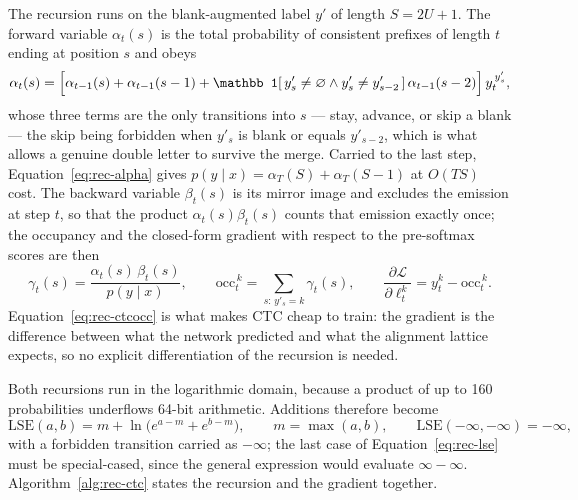 The recursion runs on the blank-augmented label $y'$ of length $S=2U+1$. The forward variable $\alpha_t(s)$ is the total probability of consistent prefixes of length $t$ ending at position $s$ and obeys
\begin{equation}
\alpha_t(s)=\Bigl[\alpha_{t-1}(s)+\alpha_{t-1}(s-1)+\mathbb 1[\,y'_s\ne\varnothing\wedge y'_s\ne y'_{s-2}\,]\,\alpha_{t-1}(s-2)\Bigr]\,y_t^{\,y'_s},\label{eq:rec-alpha}
\end{equation}
whose three terms are the only transitions into $s$ --- stay, advance, or skip a blank --- the skip being forbidden when $y'_s$ is blank or equals $y'_{s-2}$, which is what allows a genuine double letter to survive the merge. Carried to the last step, Equation~\ref{eq:rec-alpha} gives $p(y\mid x)=\alpha_T(S)+\alpha_T(S-1)$ at $O(TS)$ cost. The backward variable $\beta_t(s)$ is its mirror image and excludes the emission at step $t$, so that the product $\alpha_t(s)\beta_t(s)$ counts that emission exactly once; the occupancy and the closed-form gradient with respect to the pre-softmax scores are then
\begin{equation}
\gamma_t(s)=\frac{\alpha_t(s)\,\beta_t(s)}{p(y\mid x)},\qquad \mathrm{occ}_t^{\,k}=\sum_{s:\,y'_s=k}\gamma_t(s),\qquad \frac{\partial\mathcal L}{\partial\ell_t^{k}}=y_t^k-\mathrm{occ}_t^{\,k}.\label{eq:rec-ctcocc}
\end{equation}
Equation~\ref{eq:rec-ctcocc} is what makes CTC cheap to train: the gradient is the difference between what the network predicted and what the alignment lattice expects, so no explicit differentiation of the recursion is needed.

Both recursions run in the logarithmic domain, because a product of up to 160 probabilities underflows 64-bit arithmetic. Additions therefore become
\begin{equation}
\mathrm{LSE}(a,b)=m+\ln\bigl(e^{a-m}+e^{b-m}\bigr),\qquad m=\max(a,b),\qquad \mathrm{LSE}(-\infty,-\infty)=-\infty,\label{eq:rec-lse}
\end{equation}
with a forbidden transition carried as $-\infty$; the last case of Equation~\ref{eq:rec-lse} must be special-cased, since the general expression would evaluate $\infty-\infty$. Algorithm~\ref{alg:rec-ctc} states the recursion and the gradient together.

